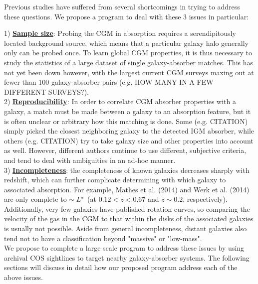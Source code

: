 \documentclass[12pt]{article}
\begin{document}

Previous studies have suffered from several shortcomings in trying to address these questions. We propose a program to deal with these 3 issues in particular:

1) \textbf{\underline{Sample size}}: Probing the CGM in absorption requires a serendipitously located background source, which means that a particular galaxy halo generally only can be probed once. To learn global CGM properties, it is thus necessary to study the statistics of a large dataset of single galaxy-absorber matches. This has not yet been down however, with the largest current CGM surveys maxing out at fewer than 100 galaxy-absorber pairs (e.g. HOW MANY IN A FEW DIFFERENT SURVEYS?).\\


2) \textbf{\underline{Reproducibility}}: In order to correlate CGM absorber properties with a galaxy, a match must be made between a galaxy to an absorption feature, but it is often unclear or arbitrary how this matching is done. Some (e.g. CITATION) simply picked the closest neighboring galaxy to the detected IGM absorber, while others (e.g. CITATION) try to take galaxy size and other properties into account as well. However, different authors continue to use different, subjective criteria, and tend to deal with ambiguities in an ad-hoc manner.\\

3) \textbf{\underline{Incompleteness}}: the completeness of known galaxies decreases sharply with redshift, which can further complicate determining with which galaxy to associated absorption. For example, Mathes et al. (2014) and Werk et al. (2014) are only complete to $\sim L^{\**}$ (at $0.12 < z < 0.67$ and $z\sim0.2$, respectively). Additionally, very few galaxies have published rotation curves, so comparing the velocity of the gas in the CGM to that within the disks of the associated galaxies is usually not possible. Aside from general incompleteness, distant galaxies also tend not to have a classification beyond "massive" or "low-mass". \\

We propose to complete a large scale program to address these issues by using archival COS sightlines to target nearby galaxy-absorber systems. The following sections will discuss in detail how our proposed program address each of the above issues.\\
\end{document}
